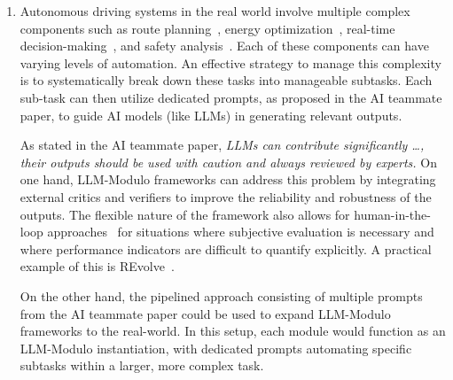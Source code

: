 \documentclass[11pt]{article}
\begin{document}
\begin{enumerate}[label=(\alph*),leftmargin=*]
    \item Autonomous driving systems in the real world involve multiple complex components such as route planning~\cite{REDA2024104630}, energy optimization~\cite{10213996}, real-time decision-making~\cite{llm4drive}, and safety analysis~\cite{reward_misdesign_ad}. Each of these components can have varying levels of automation. An effective strategy to manage this complexity is to systematically break down these tasks into manageable subtasks. Each sub-task can then utilize dedicated prompts, as proposed in the AI teammate paper, to guide AI models (like LLMs) in generating relevant outputs.

    As stated in the AI teammate paper, \emph{LLMs can contribute significantly \dots, their outputs should
    be used with caution and always reviewed by experts.} On one hand, LLM-Modulo frameworks can address this problem by integrating external critics and verifiers to improve the reliability and robustness of the outputs. The flexible nature of the framework also allows for human-in-the-loop approaches~\cite{teachable_robots,drl_hf,tamer} for situations where subjective evaluation is necessary and where performance indicators are difficult to quantify explicitly. A practical example of this is REvolve~\cite{revolve}.

     On the other hand, the pipelined approach consisting of multiple prompts from the AI teammate paper could be used to expand LLM-Modulo frameworks to the real-world. In this setup, each module would function as an LLM-Modulo instantiation, with dedicated prompts automating specific subtasks within a larger, more complex task. 
    
    


\end{enumerate}
\end{document}
